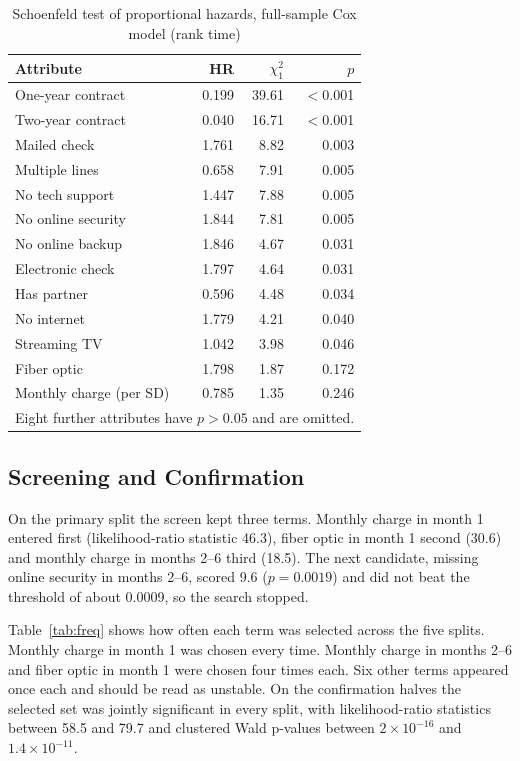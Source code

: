 \documentclass[conference]{IEEEtran}
\begin{document}
\begin{table}[t]
\caption{Schoenfeld test of proportional hazards, full-sample Cox model (rank time)}
\label{tab:ph}
\centering
\footnotesize
\begin{tabular}{lrrr}
\toprule
Attribute & HR & $\chi^2_1$ & $p$ \\
\midrule
One-year contract & 0.199 & 39.61 & $<$0.001 \\
Two-year contract & 0.040 & 16.71 & $<$0.001 \\
Mailed check & 1.761 & 8.82 & 0.003 \\
Multiple lines & 0.658 & 7.91 & 0.005 \\
No tech support & 1.447 & 7.88 & 0.005 \\
No online security & 1.844 & 7.81 & 0.005 \\
No online backup & 1.846 & 4.67 & 0.031 \\
Electronic check & 1.797 & 4.64 & 0.031 \\
Has partner & 0.596 & 4.48 & 0.034 \\
No internet & 1.779 & 4.21 & 0.040 \\
Streaming TV & 1.042 & 3.98 & 0.046 \\
Fiber optic & 1.798 & 1.87 & 0.172 \\
Monthly charge (per SD) & 0.785 & 1.35 & 0.246 \\
\bottomrule
\multicolumn{4}{l}{\scriptsize Eight further attributes have $p > 0.05$ and are omitted.}
\end{tabular}
\end{table}

\subsection{Screening and Confirmation}

On the primary split the screen kept three terms. Monthly charge in month 1 entered first (likelihood-ratio statistic 46.3), fiber optic in month 1 second (30.6) and monthly charge in months 2--6 third (18.5). The next candidate, missing online security in months 2--6, scored 9.6 ($p = 0.0019$) and did not beat the threshold of about 0.0009, so the search stopped.

Table~\ref{tab:freq} shows how often each term was selected across the five splits. Monthly charge in month 1 was chosen every time. Monthly charge in months 2--6 and fiber optic in month 1 were chosen four times each. Six other terms appeared once each and should be read as unstable. On the confirmation halves the selected set was jointly significant in every split, with likelihood-ratio statistics between 58.5 and 79.7 and clustered Wald p-values between $2\times10^{-16}$ and $1.4\times10^{-11}$.
\end{document}
